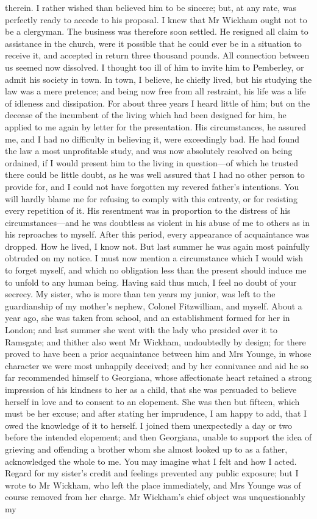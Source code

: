 therein. I rather wished than believed him to be sincere; but, at any rate, was perfectly ready to accede to his proposal. I knew that Mr Wickham ought not to be a clergyman. The business was therefore soon settled. He resigned all claim to assistance in the church, were it possible that he could ever be in a situation to receive it, and accepted in return three thousand pounds. All connection between us seemed now dissolved. I thought too ill of him to invite him to Pemberley, or admit his society in town. In town, I believe, he chiefly lived, but his studying the law was a mere pretence; and being now free from all restraint, his life was a life of idleness and dissipation. For about three years I heard little of him; but on the decease of the incumbent of the living which had been designed for him, he applied to me again by letter for the presentation. His circumstances, he assured me, and I had no difficulty in believing it, were exceedingly bad. He had found the law a most unprofitable study, and was now absolutely resolved on being ordained, if I would present him to the living in question—of which he trusted there could be little doubt, as he was well assured that I had no other person to provide for, and I could not have forgotten my revered father's intentions. You will hardly blame me for refusing to comply with this entreaty, or for resisting every repetition of it. His resentment was in proportion to the distress of his circumstances—and he was doubtless as violent in his abuse of me to others as in his reproaches to myself. After this period, every appearance of acquaintance was dropped. How he lived, I know not. But last summer he was again most painfully obtruded on my notice. I must now mention a circumstance which I would wish to forget myself, and which no obligation less than the present should induce me to unfold to any human being. Having said thus much, I feel no doubt of your secrecy. My sister, who is more than ten years my junior, was left to the guardianship of my mother's nephew, Colonel Fitzwilliam, and myself. About a year ago, she was taken from school, and an establishment formed for her in London; and last summer she went with the lady who presided over it to Ramsgate; and thither also went Mr Wickham, undoubtedly by design; for there proved to have been a prior acquaintance between him and Mrs Younge, in whose character we were most unhappily deceived; and by her connivance and aid he so far recommended himself to Georgiana, whose affectionate heart retained a strong impression of his kindness to her as a child, that she was persuaded to believe herself in love and to consent to an elopement. She was then but fifteen, which must be her excuse; and after stating her imprudence, I am happy to add, that I owed the knowledge of it to herself. I joined them unexpectedly a day or two before the intended elopement; and then Georgiana, unable to support the idea of grieving and offending a brother whom she almost looked up to as a father, acknowledged the whole to me. You may imagine what I felt and how I acted. Regard for my sister's credit and feelings prevented any public exposure; but I wrote to Mr Wickham, who left the place immediately, and Mrs Younge was of course removed from her charge. Mr Wickham's chief object was unquestionably my 